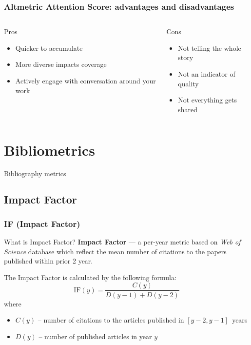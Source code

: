 \documentclass{beamer}
\newcommand{\pros}{\item[{\textcolor[HTML]{3C8031}{\ding{51}}}]}
\newcommand{\cons}{\item[\textcolor{red}{\ding{54}}]}
\newcommand{\wos}{\textit{Web of Science} }
\begin{document}
\begin{frame}
    \frametitle{Altmetric Attention Score: advantages and disadvantages}
    \begin{columns}[T]
        \begin{column}{.5\textwidth}
            \centering Pros
            \begin{itemize}[<+->]
                \pros Quicker to accumulate 
                \pros More diverse impacts coverage
                \pros Actively engage with conversation around your work
            \end{itemize}
        \end{column}
        \begin{column}{.5\textwidth}
            \centering Cons
            \begin{itemize}[<+->]
                \cons Not telling the whole story
                \cons Not an indicator of quality
                \cons Not everything gets shared
            \end{itemize}
        \end{column}
    \end{columns}
\end{frame}

\section{Bibliometrics}

\begin{frame}
    \centering
    \Huge
    Bibliography metrics
\end{frame}

\subsection{Impact Factor}
\begin{frame}
    \frametitle{IF (Impact Factor)}
    \begin{block}{What is Impact Factor?}
        \textbf{Impact Factor}\cite{garfield1972citation} --- a per-year
        metric based on \wos database which reflect the mean number of citations
        to the papers published within prior 2 year.
    \end{block}

    The Impact Factor is calculated by the following formula:
    \[
        \text{IF}(y) = \frac{C(y)}{D(y - 1) + D(y - 2)}
    \]
    where
    \begin{itemize}
        \item $C(y)$ -- number of citations to the articles published in $[y-2, y-1]$~years
        \item $D(y)$ -- number of published articles in year $y$
    \end{itemize}
\end{frame}
\end{document}

